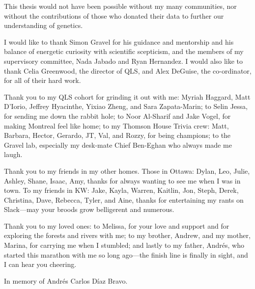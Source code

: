 This thesis would not have been possible without my many communities, nor without the contributions of those who donated their data to further our understanding of genetics.

I would like to thank Simon Gravel for his guidance and mentorship and his balance of energetic curiosity with scientific scepticism, and the members of my supervisory committee, Nada Jabado and Ryan Hernandez. I would also like to thank Celia Greenwood, the director of QLS, and Alex DeGuise, the co-ordinator, for all of their hard work.

Thank you to my QLS cohort for grinding it out with me: Myriah Haggard, Matt D'Iorio, Jeffrey Hyacinthe, Yixiao Zheng, and Sara Zapata-Marin; to Selin Jessa, for sending me down the rabbit hole; to Noor Al-Sharif and Jake Vogel, for making Montreal feel like home; to my Thomson House Trivia crew: Matt, Barbara, Hector, Gerardo, JT, Val, and Rozzy, for being champions; to the Gravel lab, especially my desk-mate Chief Ben-Eghan who always made me laugh.

Thank you to my friends in my other homes. Those in Ottawa: Dylan, Leo, Julie, Ashley, Shane, Isaac, Amy, thanks for always wanting to see me when I was in town. To my friends in KW: Jake, Kayla, Warren, Kaitlin, Jon, Steph, Derek, Christina, Dave, Rebecca, Tyler, and Aine, thanks for entertaining my rants on Slack---may your broods grow belligerent and numerous.

Thank you to my loved ones: to Melissa, for your love and support and for exploring the forests and rivers with me; to my brother, Andrew, and my mother, Marina, for carrying me when I stumbled; and lastly to my father, Andr\'{e}s, who started this marathon with me so long ago---the finish line is finally in sight, and I can hear you cheering.

\pagebreak
\hspace{0pt}
\vfill

\begin{center}
In memory of Andr\'{e}s Carlos D\'{i}az Bravo.
\end{center}

\vfill
\hspace{0pt}
\pagebreak
